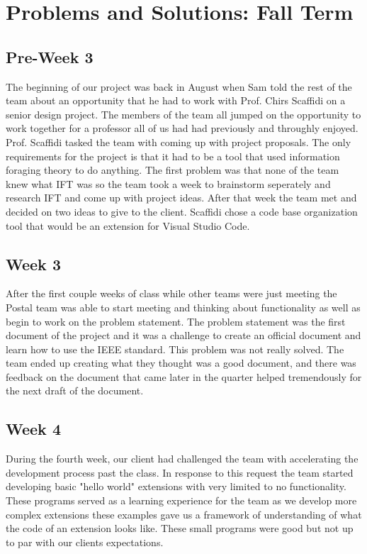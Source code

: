 \documentclass[letterpaper,10pt,titlepage,draftclsnofoot,onecolumn,onesided] {IEEEtran}
\begin{document}
\section{Problems and Solutions: Fall Term}
	\subsection{Pre-Week 3}
	The beginning of our project was back in August when Sam told the rest of the team about an opportunity that he had to work with Prof. Chirs Scaffidi on a senior design project. 
	The members of the team all jumped on the opportunity to work together for a professor all of us had had previously and throughly enjoyed.
	Prof. Scaffidi tasked the team with coming up with project proposals.
	The only requirements for the project is that it had to be a tool that used information foraging theory to do anything.
	The first problem was that none of the team knew what IFT was so the team took a week to brainstorm seperately and research IFT and come up with project ideas.
	After that week the team met and decided on two ideas to give to the client.
	Scaffidi chose a code base organization tool that would be an extension for Visual Studio Code.
	
	\subsection{Week 3}
	After the first couple weeks of class while other teams were just meeting the Postal team was able to start meeting and thinking about functionality as well as begin to work on the problem statement.
	The problem statement was the first document of the project and it was a challenge to create an official document and learn how to use the IEEE standard. 
	This problem was not really solved.
	The team ended up creating what they thought was a good document, and there was feedback on the document that came later in the quarter helped tremendously for the next draft of the document.
	
	\subsection{Week 4}
	During the fourth week, our client had challenged the team with accelerating the development process past the class.
	In response to this request the team started developing basic "hello world" extensions with very limited to no functionality.
	These programs served as a learning experience for the team as we develop more complex extensions these examples gave us a framework of understanding of what the code of an extension looks like.
	These small programs were good but not up to par with our clients expectations.	
	
\end{document}
